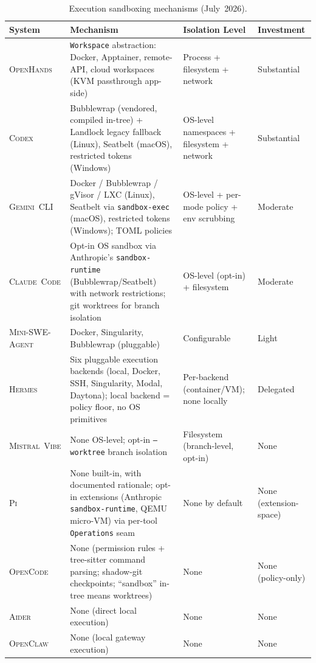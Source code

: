 \documentclass[11pt,a4paper]{article}
\newcommand{\clcode}{\textsc{Claude~Code}\xspace}
\newcommand{\cdx}{\textsc{Codex}\xspace}
\newcommand{\oh}{\textsc{OpenHands}\xspace}
\newcommand{\adr}{\textsc{Aider}\xspace}
\newcommand{\mswe}{\textsc{Mini-SWE-Agent}\xspace}
\newcommand{\ocl}{\textsc{OpenClaw}\xspace}
\newcommand{\vibe}{\textsc{Mistral~Vibe}\xspace}
\newcommand{\gemini}{\textsc{Gemini~CLI}\xspace}
\newcommand{\hrm}{\textsc{Hermes}\xspace}
\newcommand{\pib}{\textsc{Pi}\xspace}
\newcommand{\ocd}{\textsc{OpenCode}\xspace}
\begin{document}
\begin{table}[H]
\centering
\caption{Execution sandboxing mechanisms (July~2026).}
\label{tab:sandbox}
\small
\renewcommand{\arraystretch}{1.2}
\begin{tabularx}{\textwidth}{@{}l L{4.4cm} L{3.2cm} L{2.4cm}@{}}
\toprule
\textbf{System} & \textbf{Mechanism} & \textbf{Isolation Level} & \textbf{Investment} \\
\midrule
\oh{}     & \texttt{Workspace} abstraction: Docker, Apptainer, remote-API, cloud workspaces (KVM passthrough app-side) & Process + filesystem + network & Substantial \\
\cdx{}    & Bubblewrap (vendored, compiled in-tree) + Landlock legacy fallback (Linux), Seatbelt (macOS), restricted tokens (Windows) & OS-level namespaces + filesystem + network & Substantial \\
\gemini{} & Docker / Bubblewrap / gVisor / LXC (Linux), Seatbelt via \texttt{sandbox-exec} (macOS), restricted tokens (Windows); TOML policies & OS-level + per-mode policy + env scrubbing & Moderate \\
\clcode{} & Opt-in OS sandbox via Anthropic's \texttt{sandbox-runtime} (Bubblewrap/Seatbelt) with network restrictions; git worktrees for branch isolation & OS-level (opt-in) + filesystem & Moderate \\
\mswe{}   & Docker, Singularity, Bubblewrap (pluggable) & Configurable & Light \\
\hrm{}    & Six pluggable execution backends (local, Docker, SSH, Singularity, Modal, Daytona); local backend = policy floor, no OS primitives & Per-backend (container/VM); none locally & Delegated \\
\vibe{}   & None OS-level; opt-in \texttt{--worktree} branch isolation & Filesystem (branch-level, opt-in) & None \\
\pib{}    & None built-in, with documented rationale; opt-in extensions (Anthropic \texttt{sandbox-runtime}, QEMU micro-VM) via per-tool \texttt{Operations} seam & None by default & None (extension-space) \\
\ocd{}    & None (permission rules + tree-sitter command parsing; shadow-git checkpoints; ``sandbox'' in-tree means worktrees) & None & None (policy-only) \\
\adr{}    & None (direct local execution) & None & None \\
\ocl{}    & None (local gateway execution) & None & None \\
\bottomrule
\end{tabularx}
\end{table}
\end{document}
